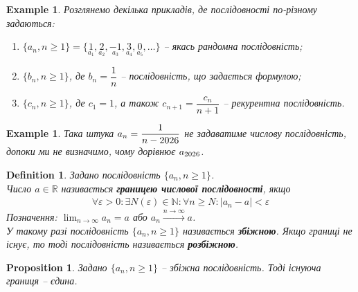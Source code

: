 \documentclass[a4paper, 14pt]{article}
\theoremstyle{theoremdd}
\theoremstyle{theoremdd}
\newtheorem{definition}[theorem]{Definition}
\theoremstyle{theoremdd}
\theoremstyle{theoremdd}
\newtheorem{example}[theorem]{Example}
\theoremstyle{theoremdd}
\newtheorem{proposition}[theorem]{Proposition}
\theoremstyle{theoremdd}
\theoremstyle{theoremdd}
\theoremstyle{theoremdd}
\begin{document}
	\begin{example}
	Розглянемо декілька прикладів, де послідовності по-різному задаються:
	\begin{enumerate}[nosep,wide=0pt,label={\arabic*)}]
	\item $\{a_n, n \geq 1\} = \{\underset{a_1}{1},\underset{a_2}{2},\underset{a_3}{-1},\underset{a_4}{3},\underset{a_5}{0},\dots\}$ -- якась рандомна послідовність;
	\item $\{b_n, n \geq 1\}$, де $b_n = \dfrac{1}{n}$ -- послідовність, що задається формулою;
	\item $\{c_n, n \geq 1\}$, де $c_1 = 1$, а також $c_{n+1} = \dfrac{c_n}{n+1}$ -- рекурентна послідовність.
	\end{enumerate}
	\end{example}
	
	\begin{example}
	Така штука $a_n = \dfrac{1}{n - \the\year}$ не задаватиме числову послідовність, допоки ми не визначимо, чому дорівнює $a_{\the\year}$.
	\end{example}
	
	\begin{definition} Задано послідовність $\{a_n, n \geq 1\}$.\\
	Число $a \in \mathbb{R}$ називається \textbf{границею числової послідовності}, якщо
	\begin{align*}
	\forall \varepsilon > 0: \exists N(\varepsilon) \in \mathbb{N}: \forall n \geq N: |a_n - a| < \varepsilon
	\end{align*}
	Позначення: $\displaystyle \lim_{n \to \infty} a_n = a$ або $a_n \xrightarrow{n \to \infty} a$.\\
	У такому разі послідовність $\{a_n,n \geq 1\}$ називається \textbf{збіжною}. Якщо границі не існує, то тоді послідовність називається \textbf{розбіжною}.
	\end{definition}
	
	\begin{proposition}
	Задано $\{a_n, n \geq 1\}$ -- збіжна послідовність. Тоді існуюча границя -- єдина.
	\end{proposition}
	
\end{document}

